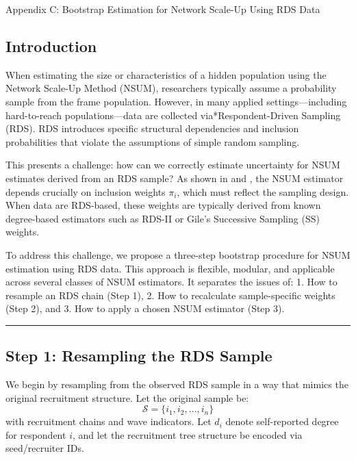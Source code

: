 \documentclass[
  12pt,
  letterpaper,
  DIV=11,
  numbers=noendperiod]{scrartcl}
\theoremstyle{plain}
\theoremstyle{definition}
\begin{document}
Appendix C: Bootstrap Estimation for Network Scale-Up Using RDS Data

\subsection{Introduction}\label{introduction}

When estimating the size or characteristics of a hidden population using
the Network Scale-Up Method (NSUM), researchers typically assume a
probability sample from the frame population. However, in many applied
settings---including hard-to-reach populations---data are collected
via*Respondent-Driven Sampling (RDS). RDS introduces specific structural
dependencies and inclusion probabilities that violate the assumptions of
simple random sampling.

This presents a challenge: how can we correctly estimate uncertainty for
NSUM estimates derived from an RDS sample? As shown in
\textcite{feeh16-generalizing} and \textcite{salg06-variance}, the NSUM
estimator depends crucially on inclusion weights \(\pi_i\), which must
reflect the sampling design. When data are RDS-based, these weights are
typically derived from known degree-based estimators such as RDS-II or
Gile's Successive Sampling (SS) weights.

To address this challenge, we propose a three-step bootstrap procedure
for NSUM estimation using RDS data. This approach is flexible, modular,
and applicable across several classes of NSUM estimators. It separates
the issues of: 1. How to resample an RDS chain (Step 1), 2. How to
recalculate sample-specific weights (Step 2), and 3. How to apply a
chosen NSUM estimator (Step 3).

\begin{center}\rule{0.5\linewidth}{0.5pt}\end{center}

\subsection{Step 1: Resampling the RDS
Sample}\label{step-1-resampling-the-rds-sample}

We begin by resampling from the observed RDS sample in a way that mimics
the original recruitment structure. Let the original sample be: \[
\mathcal{S} = \{i_1, i_2, \dots, i_n\}
\] with recruitment chains and wave indicators. Let \(d_i\) denote
self-reported degree for respondent \(i\), and let the recruitment tree
structure be encoded via seed/recruiter IDs.
\end{document}
